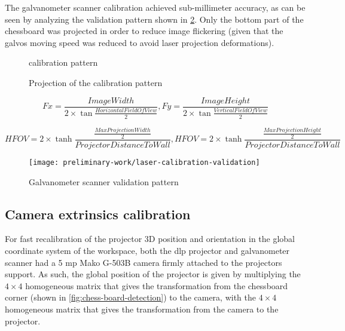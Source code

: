 The galvanometer scanner calibration achieved sub-millimeter accuracy, as can be seen by analyzing the validation pattern shown in \cref{fig:laser-calibration-validation}. Only the bottom part of the chessboard was projected in order to reduce image flickering (given that the galvos moving speed was reduced to avoid laser projection deformations).

\begin{figure}[H]
	\begin{floatrow}[2]
		{\caption{ calibration pattern}\label{fig:laser-ilda-calibration-pattern}}
		{\caption{Projection of the  calibration pattern\protect\footnotemark}\label{fig:laser-ilda-calibration-pattern-projected}}
	\end{floatrow}
\end{figure}

\begin{equation}\label{eq:intrinsics-focal-lenghts}
	Fx = \frac{\scriptstyle ImageWidth}{2 \times \tan \frac{HorizontalFieldOfView}{2}},
	Fy = \frac{\scriptstyle ImageHeight}{2 \times \tan \frac{VerticalFieldOfView}{2}}
\end{equation}

\begin{equation}\label{eq:intrinsics-field-of-view}
	HFOV = 2 \times \tanh \frac{\frac{MaxProjectionWidth}{2}}{\scriptstyle ProjectorDistanceToWall},
	HFOV = 2 \times \tanh \frac{\frac{MaxProjectionHeight}{2}}{\scriptstyle ProjectorDistanceToWall}
\end{equation}

\begin{figure}[H]
	\centering
	\texttt{[image: preliminary-work/laser-calibration-validation]}
	\caption{Galvanometer scanner validation pattern}
	\label{fig:laser-calibration-validation}
\end{figure}


\subsection{Camera extrinsics calibration}

For fast recalibration of the projector 3D position and orientation in the global coordinate system of the workspace, both the \gls{dlp} projector and galvanometer scanner had a 5 \gls{mp} Mako G-503B camera firmly attached to the projectors support. As such, the global position of the projector is given by multiplying the $4 \times 4$ homogeneous matrix that gives the transformation from the chessboard corner (shown in \cref{fig:chess-board-detection}) to the camera, with the $4 \times 4$ homogeneous matrix that gives the transformation from the camera to the projector.

